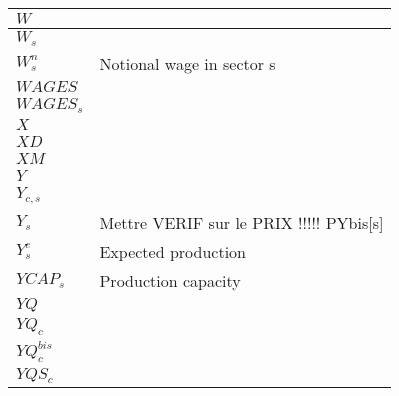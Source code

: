 \documentclass[12pt]{article}
\numberwithin{equation}{section}
\begin{document}
\begin{longtable}{@{}p{4cm}p{9cm}@{}}
$W$ &  \\
 \midrule 
$W_{s}$ &  \\
 \midrule 
$W^{n}_{s}$ & Notional wage in sector s \\
 \midrule 
$WAGES$ &  \\
 \midrule 
$WAGES_{s}$ &  \\
 \midrule 
$X$ &  \\
 \midrule 
$XD$ &  \\
 \midrule 
$XM$ &  \\
 \midrule 
$Y$ &  \\
 \midrule 
$Y_{c, s}$ &  \\
 \midrule 
$Y_{s}$ & Mettre VERIF sur le PRIX !!!!! PYbis[s] \\
 \midrule 
$Y^{e}_{s}$ & Expected production \\
 \midrule 
$YCAP_{s}$ & Production capacity \\
 \midrule 
$YQ$ &  \\
 \midrule 
$YQ_{c}$ &  \\
 \midrule 
$YQ^{bis}_{c}$ &  \\
 \midrule 
$YQS_{c}$ &  \\
\end{longtable}
\end{document}
